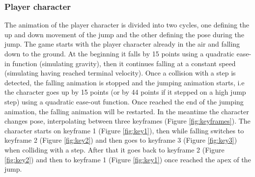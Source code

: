 \documentclass[12pt]{article}
\begin{document}
\subsubsection{Player character}
The animation of the player character is divided into two cycles, one defining the up and down movement of the jump and the other defining the pose during the jump. The game starts with the player character already in the air and falling down to the ground. At the beginning it falls by 15 points using a quadratic ease-in function (simulating gravity), then it continues falling at a constant speed (simulating having reached terminal velocity). Once a collision with a step is detected, the falling animation is stopped and the jumping animation starts, i.e the character goes up by 15 points (or by 44 points if it stepped on a high jump step) using a quadratic ease-out function. Once reached the end of the jumping animation, the falling animation will be restarted. In the meantime the character changes pose, interpolating between three keyframes (Figure \ref{fig:keyframes}). The character starts on keyframe 1 (Figure \ref{fig:key1}), then while falling switches to keyframe 2 (Figure \ref{fig:key2}) and then goes to keyframe 3 (Figure \ref{fig:key3}) when colliding with a step. After that it goes back to keyframe 2 (Figure \ref{fig:key2}) and then to keyframe 1 (Figure \ref{fig:key1}) once reached the apex of the jump.
\end{document}
